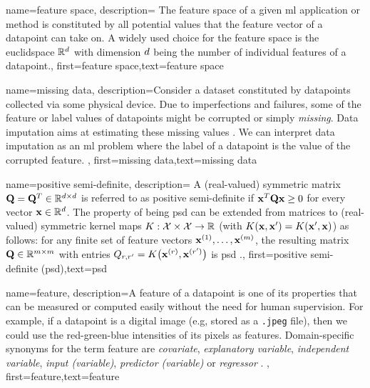 {name={feature space},
	description={
		The \gls{feature} space of a given \gls{ml} application or method is 
		constituted by all potential values that the \gls{feature} vector of a \gls{datapoint} can 
		take on. A widely used choice for the feature space is the \gls{euclidspace} $\mathbb{R}^{d}$ 
		with dimension $d$ being the number of individual \gls{feature}s of a \gls{datapoint}.},
	first={feature space},text={feature space}  
}


{name={missing data},
	description={Consider a \gls{dataset} constituted by \gls{datapoint}s collected via 
		some physical device. Due to imperfections and failures, some of the \gls{feature} 
		or \gls{label} values of \gls{datapoint}s might be corrupted or simply \emph{missing}. 
		Data imputation aims at estimating these missing values \cite{Abayomi2008DiagnosticsFM}. 
		We can interpret data imputation as an \gls{ml} problem where the \gls{label} of a \gls{datapoint} is 
		the value of the corrupted \gls{feature}. },
	first={missing data},text={missing data}  
}


{name={positive semi-definite},
	description=
	{A (real-valued) symmetric matrix $\mathbf{Q} = \mathbf{Q}^{T} \in \mathbb{R}^{d \times d}$ 
	 is referred to as positive semi-definite if ${\bf x}^{T} \mathbf{Q} {\bf x} \geq 0$ for every vector ${\bf x} \in \mathbb{R}^{d}$. 
	 The property of being psd can be extended from matrices to (real-valued) 
	 symmetric \gls{kernel} maps $K: \mathcal{X} \times \mathcal{X} \rightarrow \mathbb{R}$ 
	 (with $K({\bf x},{\bf x}') = K({\bf x}',{\bf x})$)
	 as follows: for any finite set of \gls{feature} vectors ${\bf x}^{(1)},\dots,{\bf x}^{(m)}$, 
	 the resulting matrix $\mathbf{Q} \in \mathbb{R}^{m \times m}$ with 
	entries $Q_{r,r'} = K\big({\bf x}^{(r)},{\bf x}^{(r')}\big)$ 
	is psd \cite{LearningKernelsBook}.},
	first={positive semi-definite (psd)},text={psd}  
}

{name={feature},
	description={A feature of a \gls{datapoint} is one of its properties that can be 
		measured or computed easily without the need for human supervision. For example, if a \gls{datapoint} 
		is a digital image (e.g, stored as a \texttt{.jpeg} file), then we could use the red-green-blue intensities 
		of its pixels as features. Domain-specific synonyms for the term feature are \emph{covariate}, \emph{explanatory variable}, 
		\emph{independent variable}, \emph{input (variable)}, \emph{predictor (variable)} or \emph{regressor} \cite{Gujarati2021,Dodge2003,Everitt2022}. 
		}, first={feature},text={feature}  
}

